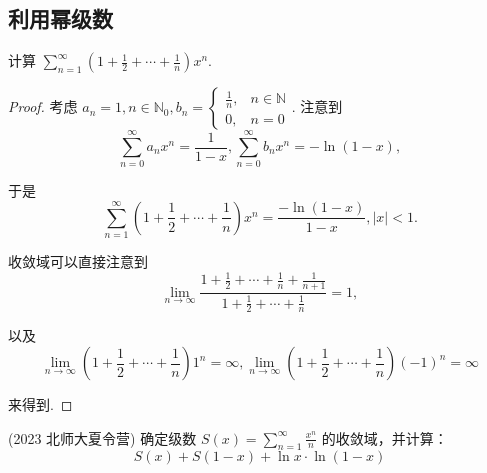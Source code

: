 \documentclass[lang=cn,10pt,thmcnt=section]{elegantbook}
\begin{document}
\subsection{利用幂级数}
\begin{example}
	计算 $\sum_{n=1}^{\infty} \left(1 + \frac{1}{2} + \cdots + \frac{1}{n}\right) x^n$.
	\end{example}
	\begin{proof}
		考虑 $a_n=1, n \in \mathbb{N}_0, b_n = 
\begin{cases} 
\frac{1}{n}, & n \in \mathbb{N} \\ 
0, & n=0 
\end{cases}
$. 注意到
\[
\sum_{n=0}^\infty a_n x^n = \frac{1}{1-x}, \sum_{n=0}^\infty b_n x^n = -\ln(1-x),
\]

\noindent
于是
\[
\sum_{n=1}^\infty \left(1+\frac{1}{2}+\cdots+\frac{1}{n}\right) x^n = \frac{-\ln(1-x)}{1-x}, |x|<1.
\]

\noindent
收敛域可以直接注意到
\[
\lim_{n\to\infty} \frac{1+\frac{1}{2}+\cdots+\frac{1}{n}+\frac{1}{n+1}}{1+\frac{1}{2}+\cdots+\frac{1}{n}} = 1,
\]

\noindent
以及
\[
\lim_{n\to\infty} \left(1+\frac{1}{2}+\cdots+\frac{1}{n}\right)1^n = \infty, \lim_{n\to\infty} \left(1+\frac{1}{2}+\cdots+\frac{1}{n}\right)(-1)^n = \infty
\]

\noindent
来得到.

	\end{proof}
	\begin{example}
	(2023 北师大夏令营) 确定级数 $S(x) = \sum_{n=1}^{\infty} \frac{x^n}{n}$ 的收敛域，并计算：
	\[
	S(x) + S(1-x) + \ln x \cdot \ln(1-x)
	\]
	\end{example}
\end{document}
